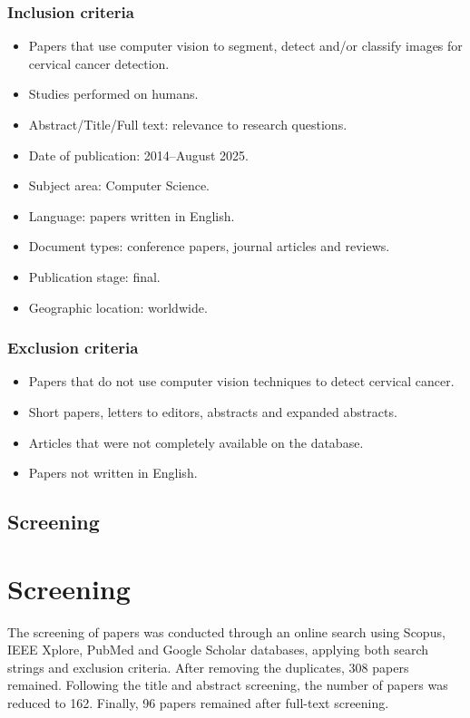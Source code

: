 \documentclass[final,5p,times,twocolumn,authoryear]{elsarticle}
\begin{document}
\subsubsection{Inclusion criteria}
\begin{itemize}
\item Papers that use computer vision to segment, detect and/or classify images for cervical cancer detection.
\item Studies performed on humans.
\item Abstract/Title/Full text: relevance to research questions.
\item Date of publication: 2014–August 2025.
\item Subject area: Computer Science.
\item Language: papers written in English.
\item Document types: conference papers, journal articles and reviews.
\item Publication stage: final.
\item Geographic location: worldwide.
\end{itemize}
\subsubsection{Exclusion criteria}
\begin{itemize}
\item Papers that do not use computer vision techniques to detect cervical cancer.
\item Short papers, letters to editors, abstracts and expanded abstracts.
\item Articles that were not completely available on the database.
\item Papers not written in English.
\end{itemize}
\subsection{Screening}

\section{Screening}
The screening of papers was conducted through an online search using Scopus, IEEE Xplore, PubMed and Google Scholar databases, applying both search strings and exclusion criteria. After removing the duplicates, 308 papers remained. Following the title and abstract screening, the number of papers was reduced to 162. Finally, 96 papers remained after full-text screening.
\end{document}
